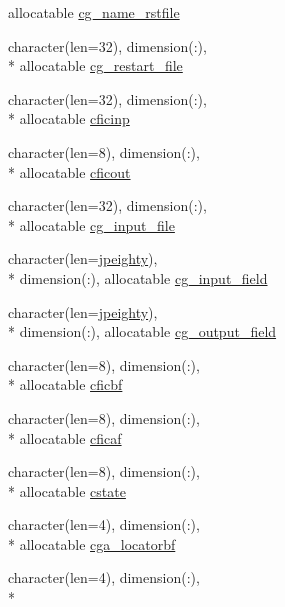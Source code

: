\begin{DoxyCompactItemize}
allocatable \hyperlink{classmod__oasis__namcouple_ac79429a9522aabddbe4ed68fd9571bec}{cg\+\_\+name\+\_\+rstfile}
\item 
character(len=32), dimension(\+:), \\*
allocatable \hyperlink{classmod__oasis__namcouple_a6eec7fe795bfb9c2058c7953c072d442}{cg\+\_\+restart\+\_\+file}
\item 
character(len=32), dimension(\+:), \\*
allocatable \hyperlink{classmod__oasis__namcouple_af17e746f51dcf0110428ebe55f6d7285}{cficinp}
\item 
character(len=8), dimension(\+:), \\*
allocatable \hyperlink{classmod__oasis__namcouple_a62f96a372f013fc37713f8ba1728e3de}{cficout}
\item 
character(len=32), dimension(\+:), \\*
allocatable \hyperlink{classmod__oasis__namcouple_a24f56cf88d79190f229d3fd1d62d17de}{cg\+\_\+input\+\_\+file}
\item 
character(len=\hyperlink{classmod__oasis__namcouple_a4fb10ad6e864dcbe34c4a8b02204a523}{jpeighty}), \\*
dimension(\+:), allocatable \hyperlink{classmod__oasis__namcouple_aad4d4857b4c424e1b0f0bcc0a01aa6e3}{cg\+\_\+input\+\_\+field}
\item 
character(len=\hyperlink{classmod__oasis__namcouple_a4fb10ad6e864dcbe34c4a8b02204a523}{jpeighty}), \\*
dimension(\+:), allocatable \hyperlink{classmod__oasis__namcouple_a1b680bf476776f3db085dc1f0009736c}{cg\+\_\+output\+\_\+field}
\item 
character(len=8), dimension(\+:), \\*
allocatable \hyperlink{classmod__oasis__namcouple_a9e90e47fd11ff4dd95c61dcf3ec872ff}{cficbf}
\item 
character(len=8), dimension(\+:), \\*
allocatable \hyperlink{classmod__oasis__namcouple_a9b3c7c879a3ff2b5eb15cbcaf5a8a1d9}{cficaf}
\item 
character(len=8), dimension(\+:), \\*
allocatable \hyperlink{classmod__oasis__namcouple_a4b507ab44ad62713c9e3d83ded6be3f4}{cstate}
\item 
character(len=4), dimension(\+:), \\*
allocatable \hyperlink{classmod__oasis__namcouple_ac22155599e9b49d57514dd1f7dc9928a}{cga\+\_\+locatorbf}
\item 
character(len=4), dimension(\+:), \\*

\end{DoxyCompactItemize}
